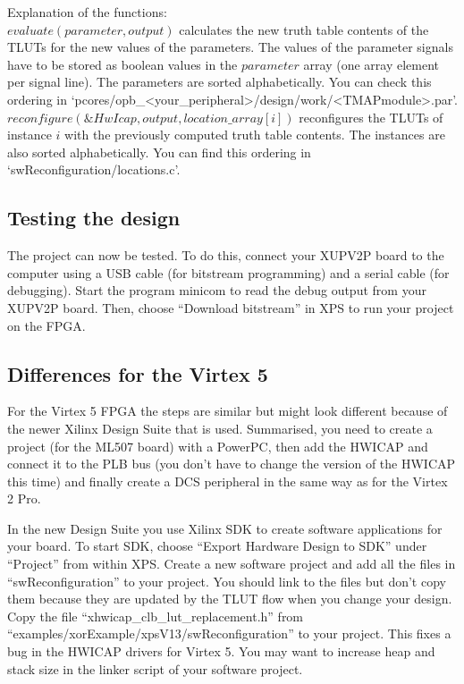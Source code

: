 \documentclass[a4paper,oneside]{memoir}
\begin{document}
Explanation of the functions:\\
$evaluate(parameter, output)$ calculates the new truth table contents of the TLUTs for the new values of the parameters. The  values of the parameter signals have to be stored as boolean values in the $parameter$ array (one array element per signal line). The parameters are sorted alphabetically. You can check this ordering in `pcores/opb\_<your\_peripheral>/design/work/<TMAPmodule>.par'.\\
$reconfigure(\&HwIcap, output, location\_array[i])$ reconfigures the TLUTs of instance $i$ with the previously computed truth table contents. The instances are also sorted alphabetically. You can find this ordering in `swReconfiguration/locations.c'.


\subsection{Testing the design}\label{sec:testing}
The project can now be tested. To do this, connect your XUPV2P board to the computer using a USB cable (for bitstream programming) and a serial cable (for debugging). Start the program minicom to read the debug output from your XUPV2P board. Then, choose ``Download bitstream'' in XPS to run your project on the FPGA.

\subsection{Differences for the Virtex 5}\label{sec:diff_virtex5}
For the Virtex 5 FPGA the steps are similar but might look different because of the newer Xilinx Design Suite that is used.
Summarised, you need to create a project (for the ML507 board) with a PowerPC, then add the HWICAP and connect it to the PLB bus (you don't have to change the version of the HWICAP this time) and finally create a DCS peripheral in the same way as for the Virtex 2 Pro.

In the new Design Suite you use Xilinx SDK to create software applications for your board. 
To start SDK, choose ``Export Hardware Design to SDK'' under ``Project'' from within XPS. 
Create a new software project and add all the files in ``swReconfiguration'' to your project. 
You should link to the files but don't copy them because they are updated by the TLUT flow when you change your design. 
Copy the file ``xhwicap\_clb\_lut\_replacement.h'' from ``examples/xorExample/xpsV13/swReconfiguration'' to your project. This fixes a bug in the HWICAP drivers for Virtex 5.
You may want to increase heap and stack size in the linker script of your software project.
\end{document}
